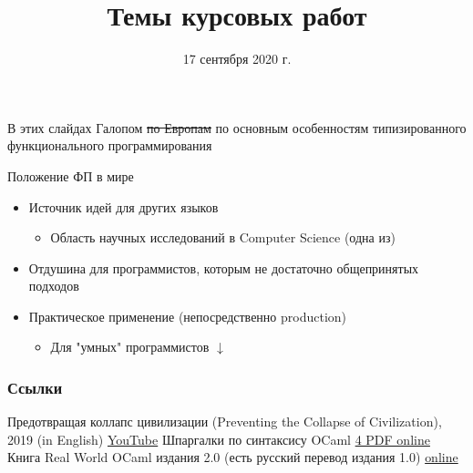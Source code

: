 \documentclass[aspectratio=169
  , xcolor={svgnames}
  , hyperref=
      { colorlinks
      , urlcolor=DarkBlue 
      }  
  , russian  %
  ]{beamer}
\title{Темы курсовых работ}
\institute{Лаборатория Языковых Инструментов при JetBrains Labs}
\date{17 сентября 2020 г.}
\begin{document}
\maketitle


\everymath{\displaystyle}

\begin{frame}{В этих слайдах}
Галопом \sout{по Европам} по основным особенностям типизированного функционального программирования\\

\tableofcontents
\end{frame}

\begin{frame}{Положение ФП в мире}
\Large 
\begin{itemize}
\item Источник идей для других языков
\begin{itemize}
\item \Large  Область научных исследований в Computer Science (одна из)
\end{itemize}
\item Отдушина для программистов, которым не достаточно общепринятых подходов
\item Практическое применение (непосредственно production)
\begin{itemize}
\item \Large  Для "умных" программистов $\downarrow$
\end{itemize}
\end{itemize}
\end{frame}


\begin{frame}%
\frametitle<presentation>{Ссылки}
\begin{thebibliography}{10}
    Предотвращая коллапс цивилизации (Preventing the Collapse of Civilization), 2019 (in English)
    \newblock\href{https://youtu.be/pW-SOdj4Kkk}{YouTube}
    Шпаргалки по синтаксису OCaml
    \newblock\href{https://ocaml.org/docs/cheat_sheets.html}{4 PDF online}
    Книга Real World OCaml издания 2.0 (есть русский перевод издания 1.0)
    \newblock\href{https://dev.realworldocaml.org/toc.html}{online}

\end{thebibliography}
\end{frame}
\end{document}
